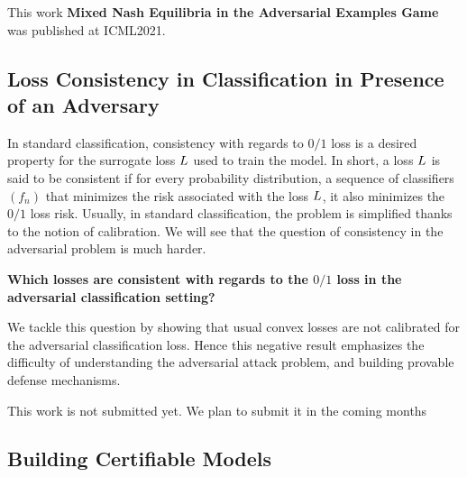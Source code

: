 This work \textbf{Mixed Nash Equilibria in the Adversarial Examples Game} was published at ICML2021.



\subsection{Loss Consistency in Classification in Presence of an Adversary}
In standard classification, consistency with regards to $0/1$ loss is a desired property for the surrogate loss $L$ used to train the model. In short, a loss $L$ is said to be consistent if for every probability distribution, a sequence of classifiers $(f_n)$ that minimizes the risk associated with the loss $L$, it also minimizes the $0/1$ loss risk. Usually, in standard classification, the problem is simplified thanks to the notion of calibration. We will see that the question of consistency in the adversarial problem is much harder. 
\medskip
\begin{tcolorbox}[title=Question 2]
\textbf{Which losses are consistent with regards to the $0/1$ loss in the adversarial classification setting?}
\end{tcolorbox}
\medskip
We tackle this question by showing that usual convex losses are not calibrated for the adversarial classification loss. Hence this negative result emphasizes the difficulty of understanding the adversarial attack problem, and building provable defense mechanisms. 

This work is not submitted yet. We plan to submit it in the coming months
\subsection{Building Certifiable Models}


